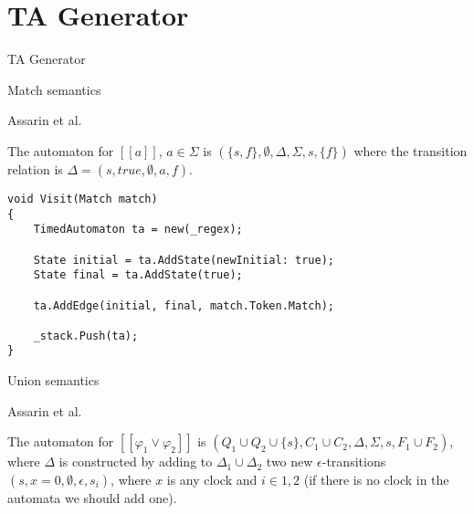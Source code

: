 
\section{TA Generator}
\begin{frame}[shrink=5]{TA Generator}
    \begin{center}
        
    \end{center}
\end{frame}
\begin{frame}[fragile]{Match semantics}
    \begin{definition}
        Assarin et al.
        
        The automaton for \underline{$[\![a]\!]$}, $a\in\Sigma$ is $(\{s,f\},\emptyset,\Delta,\Sigma,s,\{f\})$ where the transition relation is $\Delta={(s,true,\emptyset,a,f)}$.
    \end{definition}
        
    \begin{lstlisting}[style=csharp,basicstyle=\small]
void Visit(Match match)
{
    TimedAutomaton ta = new(_regex);
    
    State initial = ta.AddState(newInitial: true);
    State final = ta.AddState(true);

    ta.AddEdge(initial, final, match.Token.Match);

    _stack.Push(ta);
}
    \end{lstlisting}
\end{frame}

\begin{frame}{Union semantics}
    \begin{definition}
        
        Assarin et al.
        
        The automaton for $[[\varphi_1\vee\varphi_2]]$ is $(Q_1\cup Q_2 \cup \{s\},C_1\cup C_2,\Delta,\Sigma,s,F_1\cup F_2)$, where $\Delta$ is constructed
        by adding to $\Delta_1\cup \Delta_2$ two new $\epsilon$-transitions $(s, x = 0,\emptyset,\epsilon,s_i)$, where $x$ is any clock and $i\in{1,2}$
        (if there is no clock in the automata we should add one).
    \end{definition}

    
    
\end{frame}

